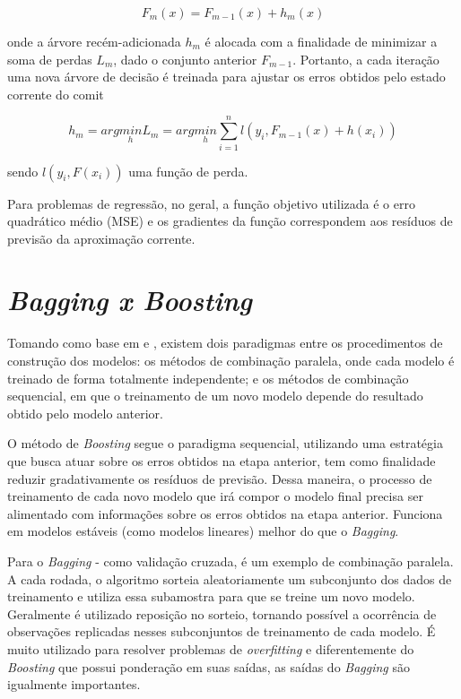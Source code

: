 \documentclass[
  openany]{book}
\begin{document}
\begin{equation}
   F_m(x)=F_{m-1}(x)+h_m(x)
    \label{eq:gdboostarvore2}
\end{equation}

onde a árvore recém-adicionada \(h_m\) é alocada com a finalidade de minimizar a soma de perdas \(L_m\), dado o conjunto anterior \(F_{m-1}\). Portanto, a cada iteração uma nova árvore de decisão é treinada para ajustar os erros
obtidos pelo estado corrente do comit

\begin{equation}
   h_m=arg \underset{h}{min} L_m = arg \underset{h}{min} \displaystyle \sum^n_{i=1}l(y_i,F_{m-1}(x)+h(x_i))
    \label{eq:gdboosttree}
\end{equation}

sendo \(l(y_i,F(x_i))\) uma função de perda.

Para problemas de regressão, no geral, a função objetivo utilizada é o erro quadrático médio (MSE) e os gradientes da função correspondem aos resíduos de previsão da aproximação corrente.

\hypertarget{bagboost}{%
\section{\texorpdfstring{\emph{Bagging x Boosting}}{Bagging x Boosting}}\label{bagboost}}

Tomando como base em \citet{zhou2012ensemble} e \citet{mayrink2015avaliaccao}, existem dois paradigmas entre os procedimentos de construção dos modelos: os métodos de combinação paralela, onde cada modelo é treinado de forma totalmente independente; e os métodos de combinação sequencial, em que o treinamento de um novo modelo depende do resultado obtido pelo modelo anterior.

O método de \emph{Boosting} segue o paradigma sequencial, utilizando uma estratégia que busca atuar sobre os erros obtidos na etapa anterior, tem como finalidade reduzir gradativamente os resíduos de previsão. Dessa maneira, o processo de treinamento de cada novo modelo que irá compor o modelo final precisa ser alimentado com informações sobre os erros obtidos na etapa anterior. Funciona em modelos estáveis (como modelos lineares) melhor do que o \emph{Bagging}.

Para o \emph{Bagging} - como validação cruzada, é um exemplo de combinação paralela. A cada rodada, o algoritmo sorteia aleatoriamente um subconjunto dos dados de treinamento e utiliza essa subamostra para que se treine um novo modelo. Geralmente é utilizado reposição no sorteio, tornando possível a ocorrência de observações replicadas nesses subconjuntos de treinamento de cada modelo. É muito utilizado para resolver problemas de \emph{overfitting} e diferentemente do \emph{Boosting} que possui ponderação em suas saídas, as saídas do \emph{Bagging} são igualmente importantes.
\end{document}
